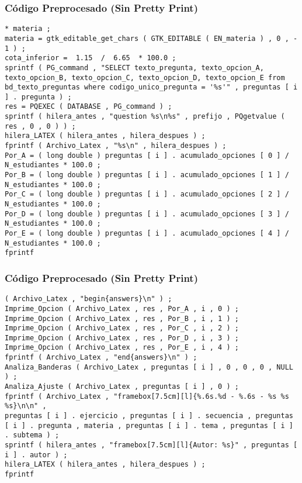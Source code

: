 \documentclass{beamer}
\begin{document}
\begin{frame}[fragile]
\frametitle{C\'odigo Preprocesado (Sin Pretty Print)}
\begin{lstlisting}[style=CStyle]
* materia ; 
materia = gtk_editable_get_chars ( GTK_EDITABLE ( EN_materia ) , 0 , - 1 ) ; 
cota_inferior =  1.15  /  6.65  * 100.0 ; 
sprintf ( PG_command , "SELECT texto_pregunta, texto_opcion_A, texto_opcion_B, texto_opcion_C, texto_opcion_D, texto_opcion_E from bd_texto_preguntas where codigo_unico_pregunta = '%s'" , preguntas [ i ] . pregunta ) ; 
res = PQEXEC ( DATABASE , PG_command ) ; 
sprintf ( hilera_antes , "question %s\n%s" , prefijo , PQgetvalue ( res , 0 , 0 ) ) ; 
hilera_LATEX ( hilera_antes , hilera_despues ) ; 
fprintf ( Archivo_Latex , "%s\n" , hilera_despues ) ; 
Por_A = ( long double ) preguntas [ i ] . acumulado_opciones [ 0 ] / N_estudiantes * 100.0 ; 
Por_B = ( long double ) preguntas [ i ] . acumulado_opciones [ 1 ] / N_estudiantes * 100.0 ; 
Por_C = ( long double ) preguntas [ i ] . acumulado_opciones [ 2 ] / N_estudiantes * 100.0 ; 
Por_D = ( long double ) preguntas [ i ] . acumulado_opciones [ 3 ] / N_estudiantes * 100.0 ; 
Por_E = ( long double ) preguntas [ i ] . acumulado_opciones [ 4 ] / N_estudiantes * 100.0 ; 
fprintf \end{lstlisting}
\end{frame}
\begin{frame}[fragile]
\frametitle{C\'odigo Preprocesado (Sin Pretty Print)}
\begin{lstlisting}[style=CStyle]
( Archivo_Latex , "begin{answers}\n" ) ; 
Imprime_Opcion ( Archivo_Latex , res , Por_A , i , 0 ) ; 
Imprime_Opcion ( Archivo_Latex , res , Por_B , i , 1 ) ; 
Imprime_Opcion ( Archivo_Latex , res , Por_C , i , 2 ) ; 
Imprime_Opcion ( Archivo_Latex , res , Por_D , i , 3 ) ; 
Imprime_Opcion ( Archivo_Latex , res , Por_E , i , 4 ) ; 
fprintf ( Archivo_Latex , "end{answers}\n" ) ; 
Analiza_Banderas ( Archivo_Latex , preguntas [ i ] , 0 , 0 , 0 , NULL ) ; 
Analiza_Ajuste ( Archivo_Latex , preguntas [ i ] , 0 ) ; 
fprintf ( Archivo_Latex , "framebox[7.5cm][l]{%.6s.%d - %.6s - %s %s %s}\n\n" , 
preguntas [ i ] . ejercicio , preguntas [ i ] . secuencia , preguntas [ i ] . pregunta , materia , preguntas [ i ] . tema , preguntas [ i ] . subtema ) ; 
sprintf ( hilera_antes , "framebox[7.5cm][l]{Autor: %s}" , preguntas [ i ] . autor ) ; 
hilera_LATEX ( hilera_antes , hilera_despues ) ; 
fprintf \end{lstlisting}
\end{frame}
\end{document}
